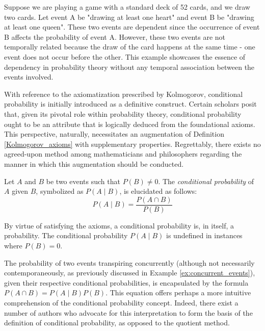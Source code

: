 \begin{example}
\label{ex:concurrent_events}
Suppose we are playing a game with a standard deck of 52 cards, and we draw two cards. Let event A be "drawing at least one heart" and event B be "drawing at least one queen". These two events are dependent since the occurrence of event B affects the probability of event A. However, these two events are not temporally related because the draw of the card happens at the same time - one event does not occur before the other. This example showcases the essence of dependency in probability theory without any temporal association between the events involved.
\end{example}

With reference to the axiomatization prescribed by Kolmogorov, conditional probability is initially introduced as a definitive construct. Certain scholars posit that, given its pivotal role within probability theory, conditional probability ought to be an attribute that is logically deduced from the foundational axioms. This perspective, naturally, necessitates an augmentation of Definition \ref{Kolmogorov_axioms} with supplementary properties. Regrettably, there exists no agreed-upon method among mathematicians and philosophers regarding the manner in which this augmentation should be conducted.

\begin{definition}
Let $A$ and $B$ be two events such that $P \left( B \right) \neq 0$. The \emph{conditional probability} of $A$ given $B$, symbolized as $P \left( A \mid B \right)$, is elucidated as follows:
\[
P\left(A\mid B\right) = \frac{P\left(A\cap B\right)}{P\left(B\right)}
\]
\end{definition}

By virtue of satisfying the axioms, a conditional probability is, in itself, a probability. The conditional probability $P\left(A\mid B\right)$ is undefined in instances where $P\left(B\right)=0$.

The probability of two events transpiring concurrently (although not necessarily contemporaneously, as previously discussed in Example \ref{ex:concurrent_events}), given their respective conditional probabilities, is encapsulated by the formula $P \left( A \cap B \right) = P \left( A \mid B \right) P \left( B \right)$. This equation offers perhaps a more intuitive comprehension of the conditional probability concept. Indeed, there exist a number of authors who advocate for this interpretation to form the basis of the definition of conditional probability, as opposed to the quotient method.

